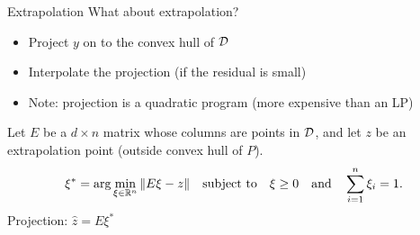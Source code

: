 \documentclass[xcolor=dvipsnames]{beamer}
\begin{document}
\begin{frame}{Extrapolation}
What about extrapolation?
\begin{itemize}
\item Project $y$ on to the convex hull of ${\cal D}$
\item Interpolate the projection (if the residual is small)
\item Note: projection is a quadratic program (more expensive than an LP)
\end{itemize}
Let $E$ be a $d\times n$ matrix whose columns are points in ${\cal D}$, and let
$z$ be an extrapolation point (outside convex hull of $P$).
$$
\xi^* = \arg\min_{\xi\in\mathbb{R}^n} \|E\xi - z\| \quad\hbox{subject to}\quad
\xi \ge 0 \quad\hbox{and}\quad \sum_{i=1}^n \xi_i = 1.
$$
Projection: ${\hat z} = E\xi^*$
\end{frame}
\end{document}
